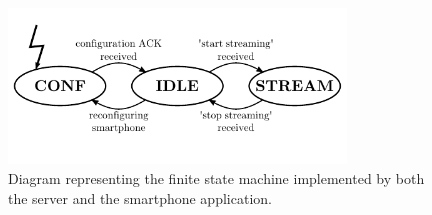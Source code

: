\documentclass[a4paper, notitlepage]{report}
\begin{document}
\begin{figure}[htb]
\centering
\includegraphics[width=0.8\textwidth]{figures/implementation/server_fsm}
\caption[Server and Android app FSM.]{Diagram representing the finite state machine implemented by both the server and the smartphone application.}
\label{fig:fsm-server}
\end{figure}
\end{document}
